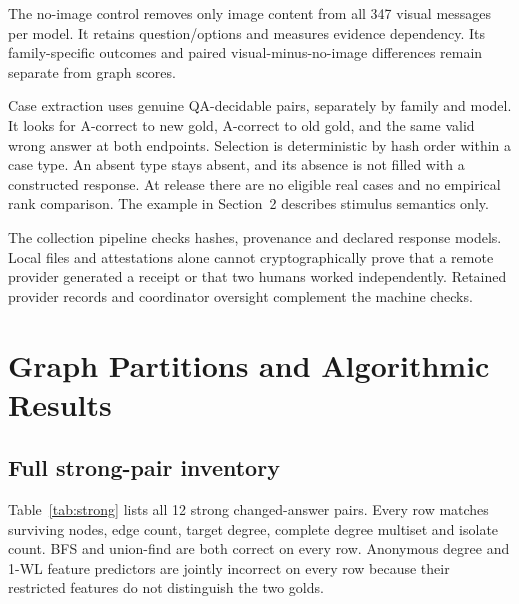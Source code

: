 \documentclass[10pt,twocolumn,letterpaper]{article}
\begin{document}
The no-image control removes only image content from all 347 visual
messages per model. It retains question/options and measures evidence
dependency. Its family-specific outcomes and paired visual-minus-no-image
differences remain separate from graph scores.

Case extraction uses genuine QA-decidable pairs, separately by family
and model. It looks for A-correct to new gold, A-correct to old gold,
and the same valid wrong answer at both endpoints. Selection is
deterministic by hash order within a case type. An absent type stays
absent, and its absence is not filled with a constructed response.
At release there are no eligible real cases and no empirical rank
comparison. The example in Section~2 describes stimulus semantics only.

The collection pipeline checks hashes, provenance and declared
response models. Local files and attestations alone cannot
cryptographically prove that a remote provider generated a receipt
or that two humans worked independently. Retained provider records
and coordinator oversight complement the machine checks.

\section{Graph Partitions and Algorithmic Results}
\subsection{Full strong-pair inventory}
Table~\ref{tab:strong} lists all 12 strong changed-answer pairs.
Every row matches surviving nodes, edge count, target degree,
complete degree multiset and isolate count. BFS and union-find are
both correct on every row. Anonymous degree and 1-WL feature
predictors are jointly incorrect on every row because their restricted
features do not distinguish the two golds.

\begin{table}[H]
\centering\small
\caption{Every strong change pair; 12 pairs from eight sources.
The final column is the exact per-pair result, not an average
over generated variants. BFS and union-find have Both=1 on every row.
The machine audit additionally supplies full feature signatures,
source-held-out lookup support and predictions.}
\label{tab:strong}

\end{table}

\begin{table}[H]
\centering\small
\caption{Natural graph source-macro accuracy in percent, with
descriptive whole-source percentile intervals. All 73 items and
24 sources are retained. Lookup training excludes the test source
and is separate from hypothetical graphs.}
\label{tab:natural}

\end{table}
\end{document}
